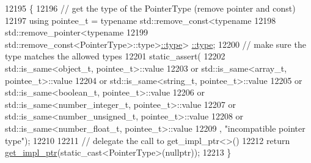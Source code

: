 \begin{DoxyCode}
12195     \{
12196         \textcolor{comment}{// get the type of the PointerType (remove pointer and const)}
12197         \textcolor{keyword}{using} pointee\_t = \textcolor{keyword}{typename} std::remove\_const<\textcolor{keyword}{typename}
12198                           std::remove\_pointer<\textcolor{keyword}{typename}
12199                           std::remove\_const<PointerType>::type>\hyperlink{classstd_1_1conditional_1_1type}{::type}>
      \hyperlink{classnlohmann_1_1basic__json_a2b2d781d7f2a4ee41bc0016e931cadf7}{::type};
12200         \textcolor{comment}{// make sure the type matches the allowed types}
12201         static\_assert(
12202             std::is\_same<object\_t, pointee\_t>::value
12203             or std::is\_same<array\_t, pointee\_t>::value
12204             or std::is\_same<string\_t, pointee\_t>::value
12205             or std::is\_same<boolean\_t, pointee\_t>::value
12206             or std::is\_same<number\_integer\_t, pointee\_t>::value
12207             or std::is\_same<number\_unsigned\_t, pointee\_t>::value
12208             or std::is\_same<number\_float\_t, pointee\_t>::value
12209             , \textcolor{stringliteral}{"incompatible pointer type"});
12210 
12211         \textcolor{comment}{// delegate the call to get\_impl\_ptr<>()}
12212         \textcolor{keywordflow}{return} \hyperlink{classnlohmann_1_1basic__json_a58b65f595883fb93333423ec5e3bafee}{get\_impl\_ptr}(static\_cast<PointerType>(\textcolor{keyword}{nullptr}));
12213     \}
\end{DoxyCode}
\mbox{\label{classnlohmann_1_1basic__json_a14abd48803a8d5447faf5f583fa8e2a1}} 
